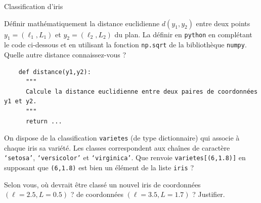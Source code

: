 \begin{exo}[PC][2][devoir]{Classification d'iris}
\begin{quest}
  \item	Définir mathématiquement la distance euclidienne $d(y_1,y_2)$ entre deux points $y_1=(\ell_1,L_1)$ et $y_2=(\ell_2,L_2)$ du plan.  La définir en \texttt{python} en complétant le code ci-dessous et en utilisant la fonction \texttt{np.sqrt} de la bibliothèque \texttt{numpy}. Quelle autre distance connaissez-vous ?
  \begin{verbatim}
    def distance(y1,y2):
      """
      Calcule la distance euclidienne entre deux paires de coordonnées y1 et y2.
      """
      return ...
  \end{verbatim}
  \item On dispose de la classification \texttt{varietes} (de type dictionnaire) qui associe à chaque iris sa variété. Les classes correspondent aux chaînes de caractère \texttt{`setosa'}, \texttt{`versicolor'} et \texttt{`virginica'}. Que renvoie \texttt{varietes[(6,1.8)]} en supposant que \texttt{(6,1.8)} est bien un élément de la liste \texttt{iris} ?
  
  \item 
  Selon vous, où devrait être classé un nouvel iris de coordonnées $(\ell=2.5,L=0.5)$ ? de coordonnées $(\ell=3.5,L=1.7)$ ? Justifier. 



\end{quest}
\end{exo}
